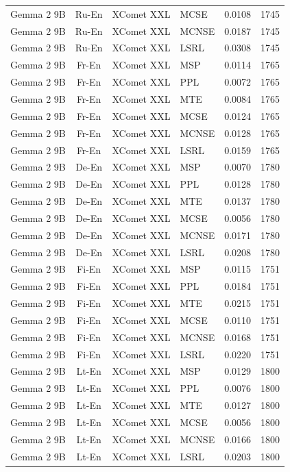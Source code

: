 \begin{table}
\begin{tabular}{lc}
Gemma 2 9B & Ru-En & XComet XXL & MCSE & 0.0108 & 1745 \\
Gemma 2 9B & Ru-En & XComet XXL & MCNSE & 0.0187 & 1745 \\
Gemma 2 9B & Ru-En & XComet XXL & LSRL & 0.0308 & 1745 \\
Gemma 2 9B & Fr-En & XComet XXL & MSP & 0.0114 & 1765 \\
Gemma 2 9B & Fr-En & XComet XXL & PPL & 0.0072 & 1765 \\
Gemma 2 9B & Fr-En & XComet XXL & MTE & 0.0084 & 1765 \\
Gemma 2 9B & Fr-En & XComet XXL & MCSE & 0.0124 & 1765 \\
Gemma 2 9B & Fr-En & XComet XXL & MCNSE & 0.0128 & 1765 \\
Gemma 2 9B & Fr-En & XComet XXL & LSRL & 0.0159 & 1765 \\
Gemma 2 9B & De-En & XComet XXL & MSP & 0.0070 & 1780 \\
Gemma 2 9B & De-En & XComet XXL & PPL & 0.0128 & 1780 \\
Gemma 2 9B & De-En & XComet XXL & MTE & 0.0137 & 1780 \\
Gemma 2 9B & De-En & XComet XXL & MCSE & 0.0056 & 1780 \\
Gemma 2 9B & De-En & XComet XXL & MCNSE & 0.0171 & 1780 \\
Gemma 2 9B & De-En & XComet XXL & LSRL & 0.0208 & 1780 \\
Gemma 2 9B & Fi-En & XComet XXL & MSP & 0.0115 & 1751 \\
Gemma 2 9B & Fi-En & XComet XXL & PPL & 0.0184 & 1751 \\
Gemma 2 9B & Fi-En & XComet XXL & MTE & 0.0215 & 1751 \\
Gemma 2 9B & Fi-En & XComet XXL & MCSE & 0.0110 & 1751 \\
Gemma 2 9B & Fi-En & XComet XXL & MCNSE & 0.0168 & 1751 \\
Gemma 2 9B & Fi-En & XComet XXL & LSRL & 0.0220 & 1751 \\
Gemma 2 9B & Lt-En & XComet XXL & MSP & 0.0129 & 1800 \\
Gemma 2 9B & Lt-En & XComet XXL & PPL & 0.0076 & 1800 \\
Gemma 2 9B & Lt-En & XComet XXL & MTE & 0.0127 & 1800 \\
Gemma 2 9B & Lt-En & XComet XXL & MCSE & 0.0056 & 1800 \\
Gemma 2 9B & Lt-En & XComet XXL & MCNSE & 0.0166 & 1800 \\
Gemma 2 9B & Lt-En & XComet XXL & LSRL & 0.0203 & 1800 \\

\end{tabular}
\end{table}
